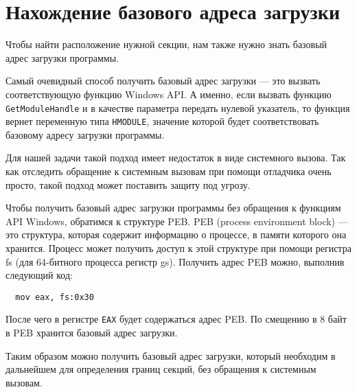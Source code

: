 
\section{Нахождение базового адреса загрузки}

Чтобы найти расположение нужной секции, нам также нужно знать базовый адрес
загрузки программы.

Самый очевидный способ получить базовый адрес загрузки --- это вызвать
соответствующую функцию Windows API. А именно, если вызвать функцию
\verb!GetModuleHandle! и в качестве параметра передать нулевой указатель, то
функция вернет переменную типа \verb!HMODULE!, значение которой будет
соответствовать базовому адресу загрузки программы.

Для нашей задачи такой подход имеет недостаток в виде системного вызова. Так как
отследить обращение к системным вызовам при помощи отладчика очень просто, такой
подход может поставить защиту под угрозу.

Чтобы получить базовый адрес загрузки программы без обращения к функциям API
Windows, обратимся к структуре PEB. PEB (process environment block) --- это
структура, которая содержит информацию о процессе, в памяти которого она
хранится. Процесс может получить доступ к этой структуре при помощи регистра fs
(для 64-битного процесса регистр gs). Получить адрес PEB можно, выполнив
следующий код:
\begin{verbatim}
  mov eax, fs:0x30
\end{verbatim}
После чего в регистре \verb!EAX! будет содержаться адрес PEB. По смещению в 8
байт в PEB хранится базовый адрес загрузки.

Таким образом можно получить базовый адрес загрузки, который необходим в
дальнейшем для определения границ секций, без обращения к системным вызовам.
